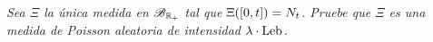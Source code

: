 \emph{
	Sea $\Xi$ la \'unica medida en $\mathscr{B}_{\mathbb{R}_+}$ tal que $\Xi\!\left( [0,t]\right) =N_t$. Pruebe que 
	$\Xi$ es una medida de Poisson aleatoria de intensidad $\lambda \cdot\text{Leb}$.
}

\afterstatement\pn